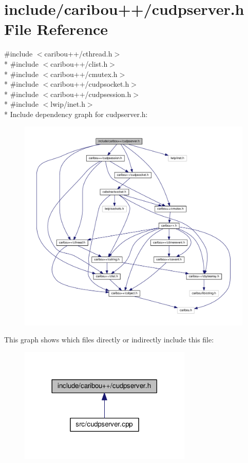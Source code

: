 \section{include/caribou++/cudpserver.h File Reference}
\label{cudpserver_8h}
{\ttfamily \#include $<$caribou++/cthread.\+h$>$}\\*
{\ttfamily \#include $<$caribou++/clist.\+h$>$}\\*
{\ttfamily \#include $<$caribou++/cmutex.\+h$>$}\\*
{\ttfamily \#include $<$caribou++/cudpsocket.\+h$>$}\\*
{\ttfamily \#include $<$caribou++/cudpsession.\+h$>$}\\*
{\ttfamily \#include $<$lwip/inet.\+h$>$}\\*
Include dependency graph for cudpserver.\+h\+:
\nopagebreak
\begin{figure}[H]
\begin{center}
\leavevmode
\includegraphics[width=350pt]{cudpserver_8h__incl}
\end{center}
\end{figure}
This graph shows which files directly or indirectly include this file\+:
\nopagebreak
\begin{figure}[H]
\begin{center}
\leavevmode
\includegraphics[width=233pt]{cudpserver_8h__dep__incl}
\end{center}
\end{figure}
